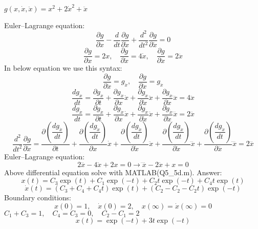 $g(x, \dot x, \ddot x) = x^2 + 2\dot x^2 + \ddot x$



Euler–Lagrange equation:
$$\dfrac{\partial g}{\partial x} - \dfrac{d}{dt}\dfrac{\partial g}{\partial \dot x} + 
\dfrac{d^2}{dt^2}\dfrac{\partial g}{\partial \ddot x} = 0
$$
$$\dfrac{\partial g}{\partial x} = 2x, \quad 
\dfrac{\partial g}{\partial \dot x} = 4\dot x, \quad 
\dfrac{\partial g}{\partial \ddot x} = 2 \ddot{x}
$$
In below equation we use this syntax:
$$\dfrac{\partial g}{\partial \ddot x} = g_{\dot x}, \quad
\dfrac{\partial g}{\partial \ddot x} = g_{\ddot x}
$$
$$\dfrac{dg_{\dot x}}{dt} = \dfrac{\partial g_{\dot x}}{\partial t} + 
\dfrac{\partial g_{\dot x}}{\partial x} \dot x +
\dfrac{\partial g_{\dot x}}{\partial \dot x} \ddot x +
\dfrac{\partial g_{\dot x}}{\partial \ddot x} \dddot x = 4 \ddot x
$$
$$\dfrac{dg_{\ddot x}}{dt} = \dfrac{\partial g_{\ddot x}}{\partial t} + 
\dfrac{\partial g_{\ddot x}}{\partial x} \dot x +
\dfrac{\partial g_{\ddot x}}{\partial \dot x} \ddot x +
\dfrac{\partial g_{\ddot x}}{\partial \ddot x} \dddot x = 2 \dddot x
$$
$$ \dfrac{d^2}{dt^2}\dfrac{\partial g}{\partial \ddot x} = \dfrac{\partial (\dfrac{dg_{\ddot x}}{dt})}{\partial t} + 
\dfrac{\partial (\dfrac{dg_{\ddot x}}{dt})}{\partial  x} \dot x +
\dfrac{\partial (\dfrac{dg_{\ddot x}}{dt})}{\partial \dot x} \ddot x +
\dfrac{\partial (\dfrac{dg_{\ddot x}}{dt})}{\partial \ddot x} \dddot x +
\dfrac{\partial (\dfrac{dg_{\ddot x}}{dt})}{\partial \dddot x} \ddddot x
 = 2 \ddddot x
$$
Euler–Lagrange equation:
$$2 \ddddot x - 4\ddot x + 2 x = 0 \to \ddddot x - 2\ddot x +  x = 0 $$
Above differential equation solve with MATLAB(Q5\_5d.m).
Answer:
$$x(t) = C_3\exp(t) + C_1\exp(-t) + C_2t\exp(-t) + C_4t\exp(t)$$
$$\dot x(t) = (C_3 + C_4 + C_4t)\exp(t) + (C_2 -C_2 -C_2t)\exp(-t)$$
Boundary conditions:
$$x(0) = 1, \quad \dot x(0) = 2, \quad x(\infty) = \dot x(\infty) = 0 $$
$C_1 + C_3  = 1, \quad C_4 = C_3  = 0,\quad C_2 - C_1 = 2 $
$$x(t) =  \exp(-t) + 3t\exp(-t) $$
